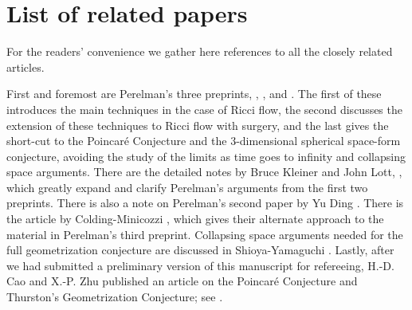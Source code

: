 \section{List of related papers}

For the readers' convenience we gather here references to all the
closely related articles.

First and foremost are Perelman's three preprints, \cite{Perelman1},
\cite{Perelman2}, and \cite{Perelman3}. The first of these
introduces the main techniques in the case of Ricci flow, the second
discusses the extension of these techniques to Ricci flow with
surgery, and the last gives the short-cut to the Poincar\'e
Conjecture and the $3$-dimensional spherical space-form conjecture,
avoiding the study of the limits as time goes to infinity and
collapsing space arguments. There are the detailed notes by Bruce
Kleiner and John Lott, \cite{KleinerLott}, which greatly expand and
clarify Perelman's arguments from the first two preprints. There is
also a note on Perelman's second paper by Yu Ding  \cite{yuding}.
There is the article by Colding-Minicozzi \cite{ColdingMinicozzi},
which gives their alternate approach to the material in Perelman's
third preprint. Collapsing space arguments needed for the full
geometrization conjecture are discussed in Shioya-Yamaguchi
\cite{SY}. Lastly, after we had submitted a preliminary version of
this manuscript for refereeing, H.-D. Cao and X.-P. Zhu published an
article on the Poincar\'e Conjecture and Thurston's Geometrization
Conjecture; see \cite{CaoZhu}.
